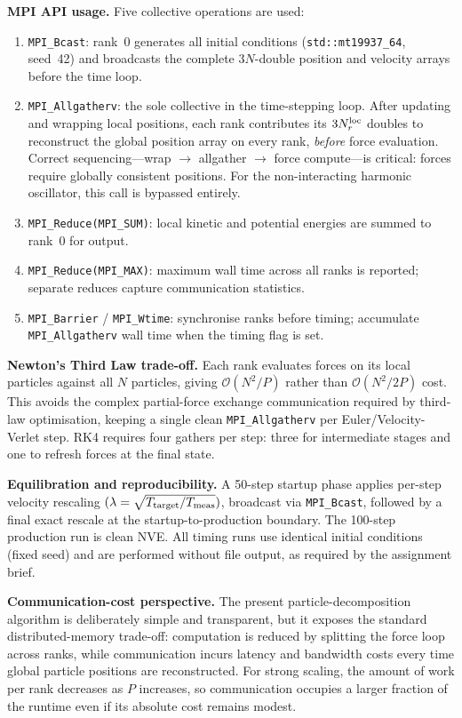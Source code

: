 \documentclass[10pt,twocolumn]{article}
\begin{document}
\textbf{MPI API usage.}
Five collective operations are used:
\begin{enumerate}\itemsep0pt
  \item \texttt{MPI\_Bcast}: rank~0 generates all initial conditions
    (\texttt{std::mt19937\_64}, seed~42) and broadcasts the complete
    $3N$-double position and velocity arrays before the time loop.
  \item \texttt{MPI\_Allgatherv}: the sole collective in the time-stepping
    loop. After updating and wrapping local positions, each rank
    contributes its $3N_r^{\rm loc}$ doubles to reconstruct the global
    position array on every rank, \emph{before} force evaluation.
    Correct sequencing---wrap $\to$ allgather $\to$ force compute---is
    critical: forces require globally consistent positions.
    For the non-interacting harmonic oscillator, this call is bypassed
    entirely.
  \item \texttt{MPI\_Reduce(MPI\_SUM)}: local kinetic and potential
    energies are summed to rank~0 for output.
  \item \texttt{MPI\_Reduce(MPI\_MAX)}: maximum wall time across all
    ranks is reported; separate reduces capture communication statistics.
  \item \texttt{MPI\_Barrier} / \texttt{MPI\_Wtime}: synchronise ranks
    before timing; accumulate \texttt{MPI\_Allgatherv} wall time when
    the timing flag is set.
\end{enumerate}

\textbf{Newton's Third Law trade-off.}
Each rank evaluates forces on its local particles against all $N$ particles,
giving $\mathcal{O}(N^2/P)$ rather than $\mathcal{O}(N^2/2P)$ cost.
This avoids the complex partial-force exchange communication required by
third-law optimisation, keeping a single clean \texttt{MPI\_Allgatherv}
per Euler/Velocity-Verlet step. RK4 requires four gathers per step:
three for intermediate stages and one to refresh forces at the final state.

\textbf{Equilibration and reproducibility.}
A 50-step startup phase applies per-step velocity rescaling
$(\lambda=\sqrt{T_{\rm target}/T_{\rm meas}})$, broadcast via
\texttt{MPI\_Bcast}, followed by a final exact rescale at the
startup-to-production boundary.
The 100-step production run is clean NVE.
All timing runs use identical initial conditions (fixed seed) and are
performed without file output, as required by the assignment brief.

\textbf{Communication-cost perspective.}
The present particle-decomposition algorithm is deliberately simple and
transparent, but it exposes the standard distributed-memory trade-off:
computation is reduced by splitting the force loop across ranks, while
communication incurs latency and bandwidth costs every time global
particle positions are reconstructed. For strong scaling, the amount of
work per rank decreases as $P$ increases, so communication occupies a
larger fraction of the runtime even if its absolute cost remains modest.
\end{document}
